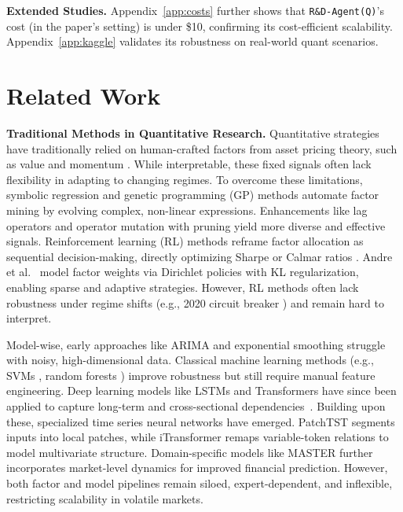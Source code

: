 \documentclass{article}
\newcommand{\name}{\texttt{R\&D-Agent(Q)}}
\begin{document}
\textbf{ Extended Studies.}
Appendix~\ref{app:costs} further shows that \texttt{\name}'s cost (in the paper's setting) is under \$10, confirming its cost-efficient scalability. Appendix~\ref{app:kaggle} validates its robustness on real-world quant scenarios.

\section{Related Work}
\textbf{Traditional Methods in Quantitative Research.}
Quantitative strategies have traditionally relied on human-crafted factors from asset pricing theory, such as value and momentum \cite{fama1993common, carhart1997persistence}. While interpretable, these fixed signals often lack flexibility in adapting to changing regimes.
To overcome these limitations, symbolic regression and genetic programming (GP) methods \cite{kamienny2023deep, petersendeep} automate factor mining by evolving complex, non-linear expressions.
Enhancements like lag operators \cite{stelmack2020kaizen} and operator mutation with pruning \cite{cui2021alphaevolve} yield more diverse and effective signals.
Reinforcement learning (RL) methods reframe factor allocation as sequential decision-making, directly optimizing Sharpe or Calmar ratios \cite{zhao2024quantfactor, hu2019deep}.
Andre et al.~\cite{andre2020dirichlet} model factor weights via Dirichlet policies with KL regularization, enabling sparse and adaptive strategies.
However, RL methods often lack robustness under regime shifts (e.g., 2020 circuit breaker \cite{gu2020empirical}) and remain hard to interpret.

Model-wise, early approaches like ARIMA \cite{7046047} and exponential smoothing \cite{exponsmoothing} struggle with noisy, high-dimensional data.
Classical machine learning methods (e.g., SVMs \cite{SVM}, random forests \cite{DecisionTree}) improve robustness but still require manual feature engineering.
Deep learning models like LSTMs \cite{CLVSA} and Transformers \cite{Transformer} have since been applied to capture long-term and cross-sectional dependencies~\cite{REST, zhao2024polymodelhedgefundsportfolio}.
Building upon these, specialized time series neural networks have emerged. PatchTST \cite{PatchTST2023} segments inputs into local patches, while iTransformer \cite{iTransformer2024} remaps variable-token relations to model multivariate structure. Domain-specific models like MASTER \cite{MASTER} further incorporates market-level dynamics for improved financial prediction.
However, both factor and model pipelines remain siloed, expert-dependent, and inflexible, restricting  scalability in volatile markets.
\end{document}
